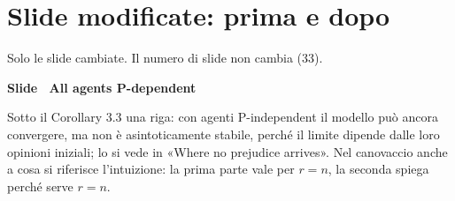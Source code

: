 \section*{Slide modificate: prima e dopo}
Solo le slide cambiate. Il numero di slide non cambia (33).
\par\addvspace{14pt}\noindent\begin{minipage}{\textwidth}
{\color{unipd}\bfseries Slide  \textperiodcentered\ All agents P-dependent}\par\smallskip
{\small Sotto il Corollary 3.3 una riga: con agenti P-independent il modello può ancora convergere, ma non è asintoticamente stabile, perché il limite dipende dalle loro opinioni iniziali; lo si vede in «Where no prejudice arrives». Nel canovaccio anche a cosa si riferisce l'intuizione: la prima parte vale per $r = n$, la seconda spiega perché serve $r = n$.}\par\smallskip
\noindent\begin{minipage}[t]{0.36\textwidth}\par
{}\par\smallskip
\end{minipage}\hfill\begin{minipage}[t]{0.61\textwidth}\par
{}\par\smallskip
\end{minipage}\par
\end{minipage}\par
